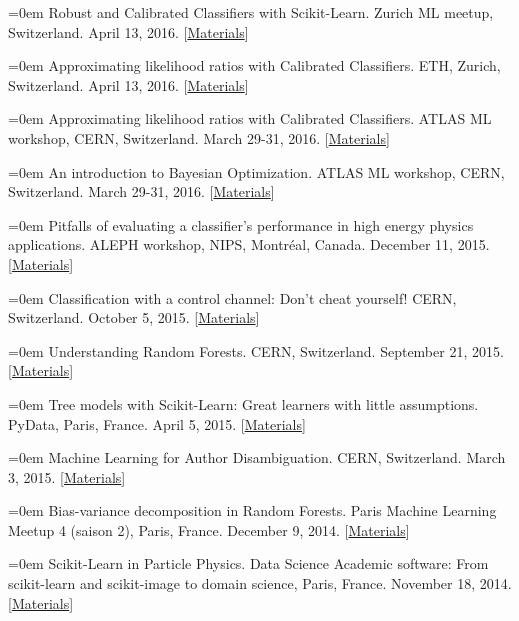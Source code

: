 \documentclass{scrartcl}
\newcommand{\MarginText}[1]{\marginpar{\raggedleft\itshape\small#1}}
\newcommand{\NewPublication}[4]{\noindent\hangindent=0em\hangafter=0 \MarginText{\color{black} #1}{\footnotesize [{\color{Maroon}#2}]} #3 {\footnotesize\color{gray}#4}\vspace{0.5em}}
\begin{document}
\begin{cv}{}
\NewPublication{}{21}{Robust and Calibrated Classifiers with Scikit-Learn.}{%
Zurich ML meetup, Switzerland.
April 13, 2016.
[\href{https://github.com/glouppe/tutorials-scikit-learn}{Materials}]}

\NewPublication{}{20}{Approximating likelihood ratios with Calibrated Classifiers.}{%
ETH, Zurich, Switzerland.
April 13, 2016.
[\href{https://github.com/glouppe/talk-approximating-likelihood-ratios-with-classifiers}{Materials}]}

\NewPublication{}{19}{Approximating likelihood ratios with Calibrated Classifiers.}{%
ATLAS ML workshop, CERN, Switzerland.
March 29-31, 2016.
[\href{https://github.com/glouppe/talk-approximating-likelihood-ratios-with-classifiers}{Materials}]}

\NewPublication{}{18}{An introduction to Bayesian Optimization.}{%
ATLAS ML workshop, CERN, Switzerland.
March 29-31, 2016.
[\href{https://github.com/glouppe/talk-bayesian-optimisation}{Materials}]}

\NewPublication{}{17}{Pitfalls of evaluating a classifier’s performance in high energy physics applications.}{%
ALEPH workshop, NIPS, Montr\'eal, Canada.
December 11, 2015.
[\href{https://github.com/glouppe/talk-aleph-workshop2015}{Materials}]}

\NewPublication{}{16}{Classification with a control channel: Don't cheat yourself!}{%
CERN, Switzerland.
October 5, 2015.
[\href{https://github.com/glouppe/talk-classification-control-channel}{Materials}]}

\NewPublication{}{15}{Understanding Random Forests.}{%
CERN, Switzerland.
September 21, 2015.
[\href{https://github.com/glouppe/talk-pydata2015}{Materials}]}

\NewPublication{}{14}{Tree models with Scikit-Learn: Great learners with little assumptions.}{%
PyData, Paris, France.
April 5, 2015.
[\href{https://github.com/glouppe/talk-pydata2015}{Materials}]}

\NewPublication{}{13}{Machine Learning for Author Disambiguation.}{%
CERN, Switzerland.
March 3, 2015.
[\href{https://github.com/glouppe/talk-disambiguation-inspire}{Materials}]}

\NewPublication{}{12}{Bias-variance decomposition in Random Forests.}{%
Paris Machine Learning Meetup 4 (saison 2), Paris, France.
December 9, 2014.
[\href{http://hdl.handle.net/2268/174897}{Materials}]}

\NewPublication{}{11}{Scikit-Learn in Particle Physics.}{%
Data Science Academic software: From scikit-learn and scikit-image to domain science, Paris, France.
November 18, 2014.
[\href{https://github.com/glouppe/talk-cds2014}{Materials}]}


\end{cv}
\end{document}
